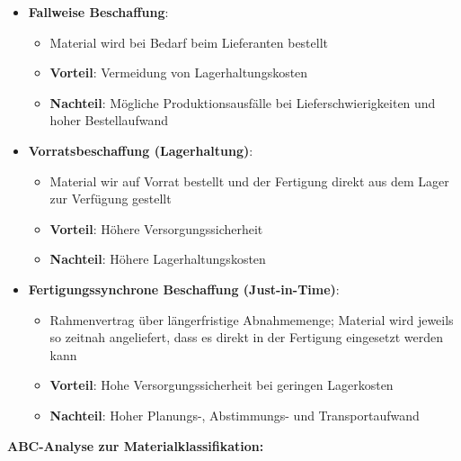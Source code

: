 \begin{itemize}
	\item \textbf{Fallweise Beschaffung}:
	\begin{itemize}
		\item Material wird bei Bedarf beim Lieferanten bestellt
		\item \textbf{Vorteil}: Vermeidung von Lagerhaltungskosten
		\item \textbf{Nachteil}: Mögliche Produktionsausfälle bei Lieferschwierigkeiten und hoher Bestellaufwand
	\end{itemize}
	\item \textbf{Vorratsbeschaffung (Lagerhaltung)}:
	\begin{itemize}
		\item Material wir auf Vorrat bestellt und der Fertigung direkt aus dem Lager zur Verfügung gestellt
		\item \textbf{Vorteil}: Höhere Versorgungssicherheit
		\item \textbf{Nachteil}: Höhere Lagerhaltungskosten
	\end{itemize}
	\item \textbf{Fertigungssynchrone Beschaffung (Just-in-Time)}:
	\begin{itemize}
		\item Rahmenvertrag über längerfristige Abnahmemenge; Material wird jeweils so zeitnah angeliefert, dass es direkt in der Fertigung eingesetzt werden kann
		\item \textbf{Vorteil}: Hohe Versorgungssicherheit bei geringen Lagerkosten
		\item \textbf{Nachteil}: Hoher Planungs-, Abstimmungs- und Transportaufwand
	\end{itemize}
\end{itemize}
\bigskip
\textbf{ABC-Analyse zur Materialklassifikation:}
